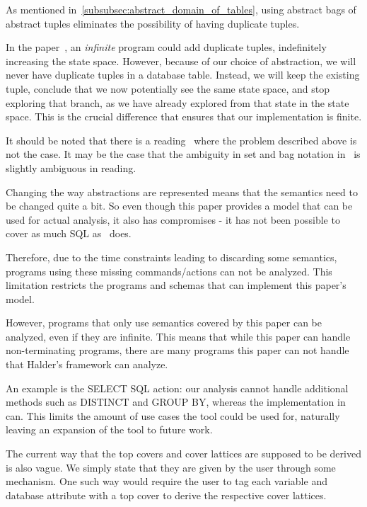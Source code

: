 As mentioned in~\autoref{subsubsec:abstract_domain_of_tables}, using abstract bags of abstract tuples eliminates the possibility of having duplicate tuples.

In the paper~\cite{halder_abstract_2012}, an \textit{infinite} program could add duplicate tuples, indefinitely increasing the state space.
However, because of our choice of abstraction, we will never have duplicate tuples in a database table.
Instead, we will keep the existing tuple, conclude that we now potentially see the same state space, and stop exploring that branch, as we have already explored from that state in the state space.
This is the crucial difference that ensures that our implementation is finite.

It should be noted that there is a reading~\cite{halder_abstract_2012} where the problem described above is not the case.
It may be the case that the ambiguity in set and bag notation in~\cite{halder_abstract_2012} is slightly ambiguous in reading.

Changing the way abstractions are represented means that the semantics need to be changed quite a bit.
So even though this paper provides a model that can be used for actual analysis, it also has compromises - it has not been possible to cover as much SQL as~\cite{halder_abstract_2012} does.


Therefore, due to the time constraints leading to discarding some semantics, programs using these missing commands/actions can not be analyzed.
This limitation restricts the programs and schemas that can implement this paper's model.

However, programs that only use semantics covered by this paper can be analyzed, even if they are infinite.
This means that while this paper can handle non-terminating programs, there are many programs this paper can not handle that Halder's framework can analyze.

An example is the SELECT SQL action: our analysis cannot handle additional methods such as DISTINCT and GROUP BY, whereas the implementation in~\cite{halder_abstract_2012} can.
This limits the amount of use cases the tool could be used for, naturally leaving an expansion of the tool to future work.

The current way that the top covers and cover lattices are supposed to be derived is also vague.
We simply state that they are given by the user through some mechanism.
One such way would require the user to tag each variable and database attribute with a top cover to derive the respective cover lattices.

